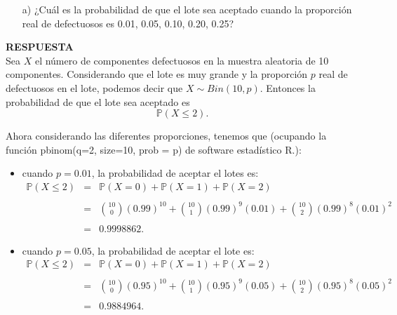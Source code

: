 \documentclass[11pt,letterpaper]{article}
\newcommand{\mP}{\mathbb{P}}
\newcommand{\res}{\textbf{RESPUESTA}\\}
\begin{document}
\begin{itemize}
\begin{itemize}
\item[a)] ¿Cuál es la probabilidad de que el lote sea aceptado cuando la proporción real de defectuosos es 0.01, 0.05, 0.10, 0.20, 0.25?
\end{itemize}

\res
Sea $X$ el número de componentes defectuosos en la muestra aleatoria de 10 componentes. Considerando que el lote es muy grande y la proporción $p$ real de defectuosos en el lote, podemos decir que $X\sim Bin(10,p)$. Entonces la probabilidad de que el lote sea aceptado es $$\mP(X\leq 2).$$

Ahora considerando las diferentes proporciones, tenemos que (ocupando la función \textsf{pbinom(q=2, size=10, prob = p)} de software estadístico R.):

\begin{itemize}
\item cuando $p=0.01$, la probabilidad de aceptar el lotes es:
\begin{equation*}
\begin{array}{ccl}
\mP(X\leq 2)&=&\mP(X=0)+\mP(X=1)+\mP(X=2)\\
&& \\
&=&{10\choose0}(0.99)^{10}+{10\choose1}(0.99)^9(0.01)+{10\choose2}(0.99)^8(0.01)^2\\
&&\\
&=&0.9998862.
\end{array}
\end{equation*}

\item cuando $p=0.05$, la probabilidad de aceptar el lote es: 
\begin{equation*}
\begin{array}{ccl}
\mP(X\leq 2)&=&\mP(X=0)+\mP(X=1)+\mP(X=2)\\
&& \\
&=&{10\choose0}(0.95)^{10}+{10\choose1}(0.95)^9(0.05)+{10\choose2}(0.95)^8(0.05)^2\\
&& \\
&=& 0.9884964.
\end{array}
\end{equation*}


\end{itemize}
\end{itemize}
\end{document}
